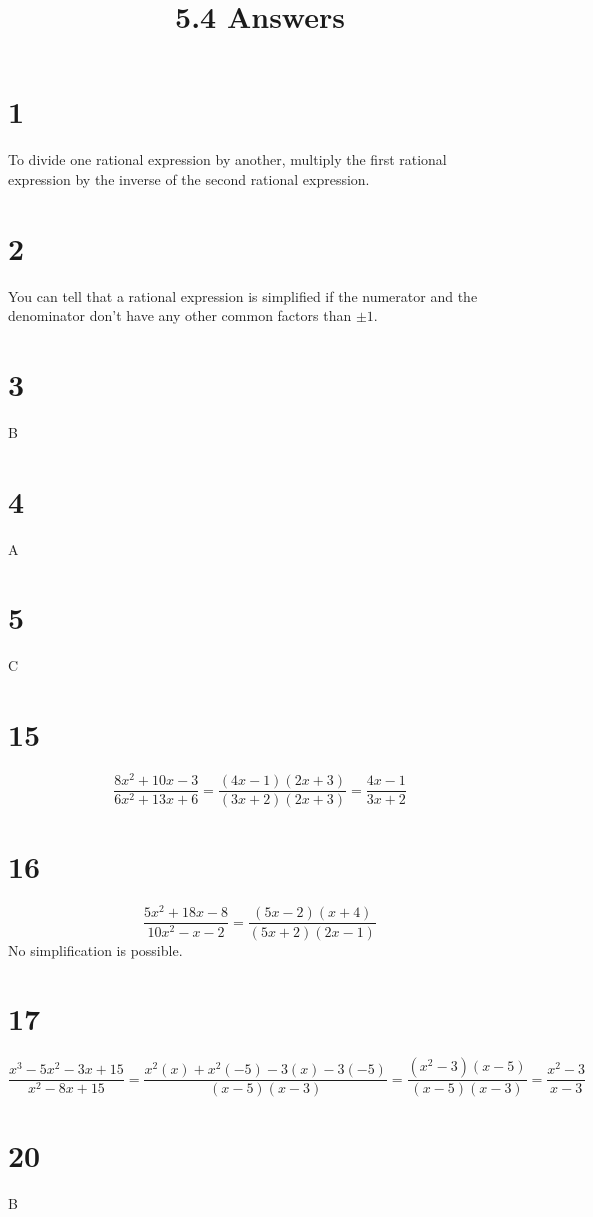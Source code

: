 \documentclass{article}
\title{5.4 Answers}
\theoremstyle{definition}
\newcommand{\?}{\stackrel{?}{=}}
\begin{document}
\maketitle

\section*{1}
To divide one rational expression by another, multiply the first rational expression by the inverse of the second rational expression.

\section*{2}
You can tell that a rational expression is simplified if the numerator and the denominator don't have any other common factors than $\pm 1$.

\section*{3}
B

\section*{4}
A

\section*{5}
C

\section*{15}
\[ \frac{8x^2+10x-3}{6x^2+13x+6}=\frac{(4x-1)(2x+3)}{(3x+2)(2x+3)}=\frac{4x-1}{3x+2} \]

\section*{16}
\[ \frac{5x^2+18x-8}{10x^2-x-2}=\frac{(5x-2)(x+4)}{(5x+2)(2x-1)} \]
No simplification is possible.

\section*{17}
\[ \frac{x^3-5x^2-3x+15}{x^2-8x+15}=\frac{x^2(x)+x^2(-5)-3(x)-3(-5)}{(x-5)(x-3)}=\frac{(x^2-3)(x-5)}{(x-5)(x-3)}=\frac{x^2-3}{x-3} \]

\section*{20}
B
\end{document}
